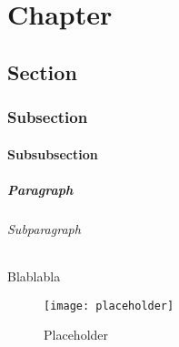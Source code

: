 \chapter{Chapter} %

\section{Section} %

\subsection{Subsection} %

\subsubsection{Subsubsection} %

\paragraph{Paragraph} %

\subparagraph{Subparagraph}  %

Blablabla

\begin{figure}[H]
    \centering
    \texttt{[image: placeholder]}
    \caption{Placeholder}
\end{figure}